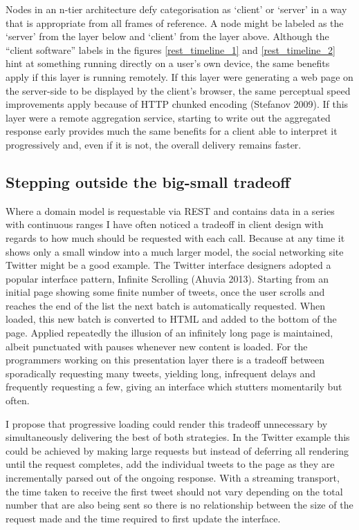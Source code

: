 \documentclass[12pt, ]{article}
\begin{document}
Nodes in an n-tier architecture defy categorisation as `client' or
`server' in a way that is appropriate from all frames of reference. A
node might be labeled as the `server' from the layer below and `client'
from the layer above. Although the ``client software'' labels in the
figures \ref{rest_timeline_1} and \ref{rest_timeline_2} hint at
something running directly on a user's own device, the same benefits
apply if this layer is running remotely. If this layer were generating a
web page on the server-side to be displayed by the client's browser, the
same perceptual speed improvements apply because of HTTP chunked
encoding (Stefanov 2009). If this layer were a remote aggregation
service, starting to write out the aggregated response early provides
much the same benefits for a client able to interpret it progressively
and, even if it is not, the overall delivery remains faster.

\subsection{Stepping outside the big-small
tradeoff}\label{stepping-outside-the-big-small-tradeoff}

Where a domain model is requestable via REST and contains data in a
series with continuous ranges I have often noticed a tradeoff in client
design with regards to how much should be requested with each call.
Because at any time it shows only a small window into a much larger
model, the social networking site Twitter might be a good example. The
Twitter interface designers adopted a popular interface pattern,
Infinite Scrolling (Ahuvia 2013). Starting from an initial page showing
some finite number of tweets, once the user scrolls and reaches the end
of the list the next batch is automatically requested. When loaded, this
new batch is converted to HTML and added to the bottom of the page.
Applied repeatedly the illusion of an infinitely long page is
maintained, albeit punctuated with pauses whenever new content is
loaded. For the programmers working on this presentation layer there is
a tradeoff between sporadically requesting many tweets, yielding long,
infrequent delays and frequently requesting a few, giving an interface
which stutters momentarily but often.

I propose that progressive loading could render this tradeoff
unnecessary by simultaneously delivering the best of both strategies. In
the Twitter example this could be achieved by making large requests but
instead of deferring all rendering until the request completes, add the
individual tweets to the page as they are incrementally parsed out of
the ongoing response. With a streaming transport, the time taken to
receive the first tweet should not vary depending on the total number
that are also being sent so there is no relationship between the size of
the request made and the time required to first update the interface.
\end{document}
